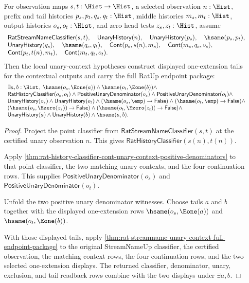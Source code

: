 \begin{theorem}
\label{thm:rat-streamname-unary-context-e1-tail-coverage-package}
For observation maps $s,t:\Hist\to\Hist$, a selected observation $n:\Hist$,
prefix and tail histories $p_s,p_t,q_s,q_t:\Hist$, middle histories
$m_s,m_t:\Hist$, output histories $o_s,o_t:\Hist$, and zero-head tests
$z_s,z_t:\Hist$, assume
$$
\begin{array}{l}
\mathsf{RatStreamNameClassifier}(s,t),\quad
\mathsf{UnaryHistory}(n),\quad
\mathsf{UnaryHistory}(p_s),\quad
\hsame(p_s,p_t),\\
\mathsf{UnaryHistory}(q_s),\quad
\hsame(q_s,q_t),\quad
\mathsf{Cont}(p_s,s(n),m_s),\quad
\mathsf{Cont}(m_s,q_s,o_s),\\
\mathsf{Cont}(p_t,t(n),m_t),\quad
\mathsf{Cont}(m_t,q_t,o_t).
\end{array}
$$
Then the local unary-context hypotheses construct displayed one-extension tails
for the contextual outputs and carry the full RatUp endpoint package:
$$
\begin{array}{l}
\exists a,b:\Hist,\ 
\hsame(o_s,\Eone(a))\land
\hsame(o_t,\Eone(b))\land\\
\mathsf{RatHistoryClassifier}(o_s,o_t)\land
\mathsf{PositiveUnaryDenominator}(o_s)\land
\mathsf{PositiveUnaryDenominator}(o_t)\land\\
\mathsf{UnaryHistory}(o_s)\land
\mathsf{UnaryHistory}(o_t)\land
(\hsame(o_s,\emp)\to\mathsf{False})\land
(\hsame(o_t,\emp)\to\mathsf{False})\land\\
(\hsame(o_s,\Ezero(z_s))\to\mathsf{False})\land
(\hsame(o_t,\Ezero(z_t))\to\mathsf{False})\land\\
\mathsf{UnaryHistory}(a)\land
\mathsf{UnaryHistory}(b)\land
\hsame(a,b).
\end{array}
$$
\end{theorem}
\begin{proof}
Project the point classifier from
$\mathsf{RatStreamNameClassifier}(s,t)$ at the certified unary observation $n$.
This gives $\mathsf{RatHistoryClassifier}(s(n),t(n))$.

Apply
\autoref{thm:rat-history-classifier-cont-unary-context-positive-denominators}
to that point classifier, the two matching unary contexts, and the four
continuation rows. This supplies
$\mathsf{PositiveUnaryDenominator}(o_s)$ and
$\mathsf{PositiveUnaryDenominator}(o_t)$.

Unfold the two positive unary denominator witnesses. Choose tails $a$ and $b$
together with the displayed one-extension rows
$\hsame(o_s,\Eone(a))$ and $\hsame(o_t,\Eone(b))$.

With those displayed tails, apply
\autoref{thm:rat-streamname-unary-context-full-endpoint-package} to the original
StreamNameUp classifier, the certified observation, the matching context rows,
the four continuation rows, and the two selected one-extension displays. The
returned classifier, denominator, unary, exclusion, and tail readback rows
combine with the two displays under $\exists a,b$.
\end{proof}

